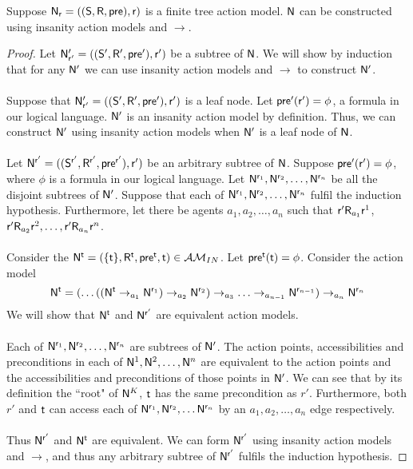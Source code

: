 \begin{lemma} \label{finTreeConstruct}
Suppose $\evM_\evr = ((\evS, \evR, \evpr), \evr)$ is a finite tree action model.
$\evM$ can be constructed using insanity action models and $\to$.
\end{lemma}
\begin{proof}
Let $\evM'_{\evr'} = ((\evS', \evR', \evpr'), \evr')$ be a subtree of $\evM$.
We will show by induction that for any $\evM'$ we can use insanity action models and $\to$ to
construct $\evM'$.\\
\\
Suppose that $\evM'_{\evr'} = ((\evS', \evR', \evpr'), \evr')$ is a leaf node.
Let $\evpr'(\evr') = \phi$, a formula in our logical language.
$\evM'$ is an insanity action model by definition.
Thus, we can construct $\evM'$ using insanity action models when $\evM'$ is a leaf node of $\evM$.\\
\\
Let $\evM^{\evr'} = ((\evS^{\evr'}, \evR^{\evr'}, \evpr^{\evr'}), \evr')$ be an arbitrary subtree of $\evM$.
Suppose $\evpr'(\evr') = \phi$, where $\phi$ is a formula in our logical language.
Let $\evM^{\evr_1}, \evM^{\evr_2}, \ldots, \evM^{\evr_n}$ be all the disjoint subtrees of $\evM'$.
Suppose that each of $\evM^{\evr_1}, \evM^{\evr_2}, \ldots, \evM^{\evr_n}$ fulfil the induction hypothesis.
Furthermore, let there be agents $a_1, a_2, \ldots, a_n$ such that $\evr' \evR_{a_1} \evr^1$, $\evr'
\evR_{a_2} \evr^2, \ldots, \evr' \evR_{a_n} \evr^n$.\\
\\
Consider the $\evM^\evt = (\{ \evt \}, \evR^\evt, \evpr^\evt, \evt) \in \insaneClass$.
Let $\evpr^\evt(\evt) = \phi$.
Consider the action model 
\[
	\evM^\evt = (\ldots((\evM^\evt \to_{a_1} \evM^{\evr_1}) \to_{a_2} \evM^{\evr_2}) \to_{a_3} \ldots
	\to_{a_{n-1}} \evM^{\evr_{n-1}} ) \to_{a_n} \evM^{\evr_n}
\]
We will show that $\evM^\evt$ and $\evM^{\evr'}$ are equivalent action models.\\
\\
Each of $\evM^{\evr_1}, \evM^{\evr_2}, \ldots, \evM^{\evr_n}$ are subtrees of $\evM'$.
The action points, accessibilities and preconditions in each of $\evM^1, \evM^2, \ldots, \evM^n$ are
equivalent to the action points and the accessibilities and preconditions of those points in $\evM'$.
We can see that by its definition the ``root" of $\evM^K$, $\evt$ has the same precondition as $r'$.
Furthermore, both $r'$ and $\evt$ can access each of $\evM^{\evr_1}, \evM^{\evr_2}, \ldots
\evM^{\evr_n}$ by an $a_1, a_2, \ldots, a_n$ edge
respectively.\\
\\
Thus $\evM^{\evr'}$ and $\evM^\evt$ are equivalent.
We can form $\evM^{\evr'}$ using insanity action models and $\to$, and thus any arbitrary subtree of
$\evM^{\evr'}$
fulfils the induction hypothesis.
\end{proof}

